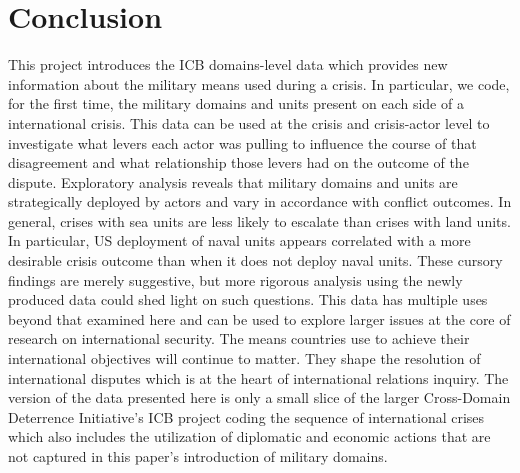 \documentclass[12pt,letterpaper]{article}
\begin{document}
\section{Conclusion}
This project introduces the ICB domains-level data which provides new information about the military means used during a crisis. In particular, we code, for the first time, the military domains and units present on each side of a international crisis. This data can be used at the crisis and crisis-actor level to investigate what levers each actor was pulling to influence the course of that disagreement and what relationship those levers had on the outcome of the dispute. Exploratory analysis reveals that military domains and units are strategically deployed by actors and vary in accordance with conflict outcomes. In general, crises with sea units are less likely to escalate than crises with land units. In particular, US deployment of naval units appears correlated with a more desirable crisis outcome than when it does not deploy naval units. These cursory findings are merely suggestive, but more rigorous analysis using the newly produced data could shed light on such questions. This data has multiple uses beyond that examined here and can be used to explore larger issues at the core of research on international security. The means countries use to achieve their international objectives will continue to matter. They shape the resolution of international disputes which is at the heart of international relations inquiry. The version of the data presented here is only a small slice of the larger Cross-Domain Deterrence Initiative's ICB project coding the sequence of international crises which also includes the utilization of diplomatic and economic actions that are not captured in this paper's introduction of military domains.

\singlespacing


	
\end{document}
